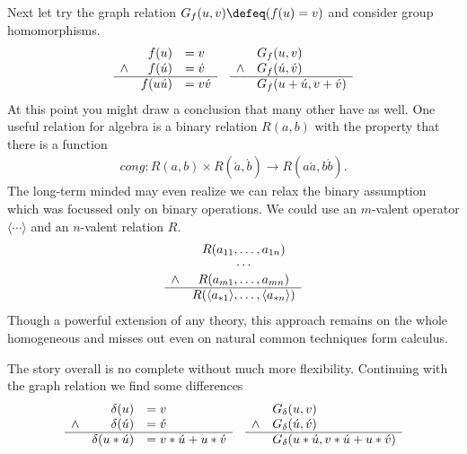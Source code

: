 Next let try the graph relation $G_f(u,v)\defeq (f(u)=v)$
and consider group homomorphisms.
\begin{align*}
\begin{array}{crl}
        & f(u) & = v\\
    \wedge & f(\acute{u}) & =\acute{v}\\
    \hline 
        & f(u\acute{u}) & = v\acute{v}
\end{array}
    & & 
\begin{array}{cl}
        & G_f(u,v)\\
    \wedge & G_f(\acute{u},\acute{v})\\
    \hline 
        & G_f(u+\acute{u},v+\acute{v})
\end{array}
\end{align*}
At this point you might draw a conclusion that many other have as 
well.  One useful relation for algebra is a binary relation $R(a,b)$
with the property that there is a function 
\begin{align*}
    cong:R(a,b)\times R(\acute{a},\acute{b})\to R(a\acute{a},b\acute{b}).
\end{align*}
The long-term minded may even realize we can relax the binary assumption 
which was focussed only on binary operations.  We could use an 
$m$-valent operator $\langle\cdots\rangle$ and an $n$-valent relation $R$.
\begin{align*}
    \begin{array}{cc}
        & R(a_{11},\ldots,a_{1n})\\
        & \cdots \\
    \wedge    & R(a_{m1},\ldots,a_{mn})\\
    \hline 
        & R(\langle a_{*1}\rangle,\ldots,\langle a_{*n}\rangle)
    \end{array}
\end{align*}
Though a powerful extension of any theory, this approach remains on the 
whole homogeneous and misses out even on natural common techniques form 
calculus.

The story overall is no complete without much more flexibility.
Continuing with the graph relation we find some differences
\begin{align*}
    \begin{array}{crl}
        & \delta(u) & =v\\
    \wedge &\delta(\acute{u}) & =\acute{v}\\
    \hline 
        & \delta(u*\acute{u}) & =v*\acute{u}+u*\acute{v}
    \end{array}
&&
    \begin{array}{cl}
        & G_{\delta}(u,v)\\
    \wedge & G_{\delta}(\acute{u},\acute{v})\\
    \hline 
        & G_{\delta}(u*\acute{u},v*\acute{u}+u*\acute{v})
    \end{array}
\end{align*}


